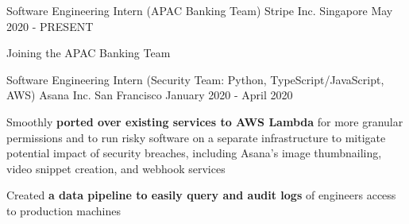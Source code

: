 

\begin{cventries}


  \cventry
  {Software Engineering Intern (APAC Banking Team)} %
  {Stripe Inc.} %
  {Singapore} %
  {May 2020 - PRESENT} %
  {
    \begin{cvitems}
    \item {Joining the APAC Banking Team}
    \end{cvitems}
  }

  \cventry
  {Software Engineering Intern (Security Team: Python, TypeScript/JavaScript, AWS)} %
  {Asana Inc.} %
  {San Francisco} %
  {January 2020 - April 2020} %
  {
    \begin{cvitems}
    \item {Smoothly \textbf{ported over existing services to AWS Lambda} for more granular permissions and to run risky software on a separate infrastructure to mitigate potential impact of security breaches, including Asana's image thumbnailing, video snippet creation, and webhook services}
    \item {Created \textbf{a data pipeline to easily query and audit logs} of engineers access to production machines}
    \end{cvitems}
  }


\end{cventries}
